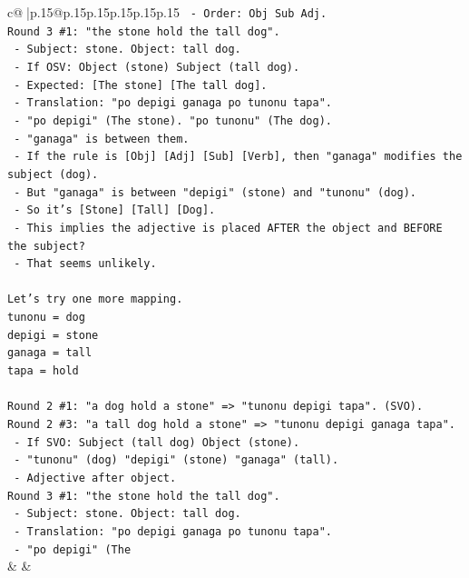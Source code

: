\documentclass{article}
\begin{document}
{\begin{supertabular}{c@{$\;$}|p{.15\linewidth}@{}p{.15\linewidth}p{.15\linewidth}p{.15\linewidth}p{.15\linewidth}p{.15\linewidth}}
{{{\texttt{  {-} Order: Obj Sub Adj.} \\
\texttt{Round 3 \#1: "the stone hold the tall dog".} \\
\texttt{  {-} Subject: stone. Object: tall dog.} \\
\texttt{  {-} If OSV: Object (stone) Subject (tall dog).} \\
\texttt{  {-} Expected: {[}The stone{]} {[}The tall dog{]}.} \\
\texttt{  {-} Translation: "po depigi ganaga po tunonu tapa".} \\
\texttt{  {-} "po depigi" (The stone). "po tunonu" (The dog).} \\
\texttt{  {-} "ganaga" is between them.} \\
\texttt{  {-} If the rule is {[}Obj{]} {[}Adj{]} {[}Sub{]} {[}Verb{]}, then "ganaga" modifies the subject (dog).} \\
\texttt{  {-} But "ganaga" is between "depigi" (stone) and "tunonu" (dog).} \\
\texttt{  {-} So it's {[}Stone{]} {[}Tall{]} {[}Dog{]}.} \\
\texttt{  {-} This implies the adjective is placed AFTER the object and BEFORE the subject?} \\
\texttt{  {-} That seems unlikely.} \\
\\ 
\texttt{Let's try one more mapping.} \\
\texttt{tunonu = dog} \\
\texttt{depigi = stone} \\
\texttt{ganaga = tall} \\
\texttt{tapa = hold} \\
\\ 
\texttt{Round 2 \#1: "a dog hold a stone" => "tunonu depigi tapa". (SVO).} \\
\texttt{Round 2 \#3: "a tall dog hold a stone" => "tunonu depigi ganaga tapa".} \\
\texttt{  {-} If SVO: Subject (tall dog) Object (stone).} \\
\texttt{  {-} "tunonu" (dog) "depigi" (stone) "ganaga" (tall).} \\
\texttt{  {-} Adjective after object.} \\
\texttt{Round 3 \#1: "the stone hold the tall dog".} \\
\texttt{  {-} Subject: stone. Object: tall dog.} \\
\texttt{  {-} Translation: "po depigi ganaga po tunonu tapa".} \\
\texttt{  {-} "po depigi" (The} \\
            }
        }
    }
    & & \\ \\


\end{supertabular}}
\end{document}
